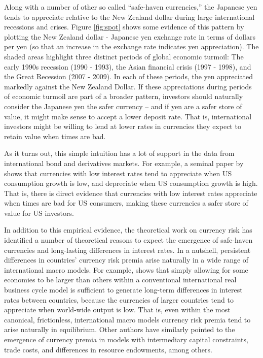 \documentclass{ar-1col}
\begin{document}
Along with a number of other so called ``safe-haven currencies,'' the Japanese yen tends to appreciate relative to the New Zealand dollar during large international recessions and crises.
Figure \ref{fig:spot} shows some evidence of this pattern by plotting the New Zealand dollar - Japanese yen exchange rate in terms of dollars per yen (so that an increase in the exchange rate indicates yen appreciation). The shaded areas highlight three distinct periods of global economic turmoil: The early 1990s recession (1990 - 1993), the Asian financial crisis (1997 - 1998), and the Great Recession (2007 - 2009). In each of these periods, the yen appreciated markedly against the New Zealand Dollar. If these appreciations during periods of economic turmoil are part of a broader pattern, investors should naturally consider the Japanese yen the safer currency -- and if yen are a safer store of value, it might make sense to accept a lower deposit rate. That is, international investors might be willing to lend at lower rates in currencies they expect to retain value when times are bad.

As it turns out, this simple intuition has a lot of support in the data from international bond and derivatives markets. For example, a seminal paper by \citet{LustigVerdelhan2007} shows that currencies with low interest rates tend to appreciate when US consumption growth is low, and depreciate when US consumption growth is high. That is, there is direct evidence that currencies with low interest rates appreciate when times are bad for US consumers, making these currencies a safer store of value for US investors.

In addition to this empirical evidence, the theoretical work on currency risk has identified a number of theoretical reasons to expect the emergence of safe-haven currencies and long-lasting differences in interest rates. In a nutshell, persistent differences in countries' currency risk premia arise naturally in a wide range of international macro models. For example, \citet{Hassan2013} shows that simply allowing for some economies to be larger than others within a conventional international real business cycle model is sufficient to generate long-term differences in interest rates between countries, because the currencies of larger countries tend to appreciate when world-wide output is low. That is, even within the most canonical, frictionless, international macro models currency risk premia tend to arise naturally in equilibrium. Other authors have similarly pointed to the emergence of currency premia in models with intermediary capital constraints, trade costs, and differences in resource endowments, among others.
\end{document}
